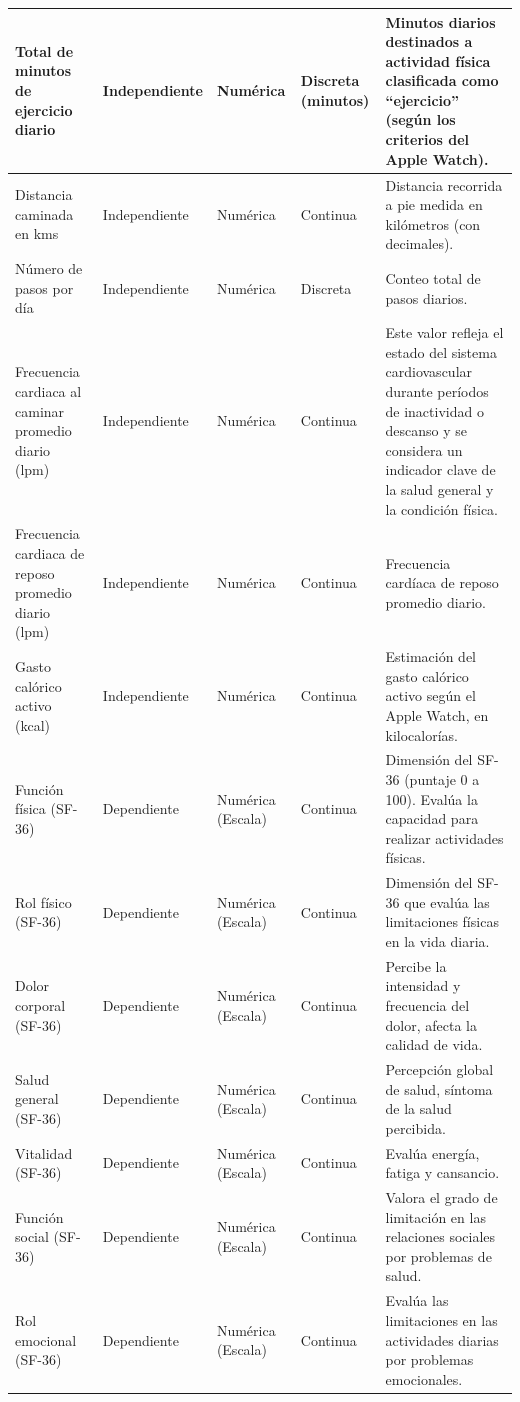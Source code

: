 \begin{table}[H]
\begin{longtable}{@{}p{3.5cm}p{2cm}p{2cm}p{2cm}p{4.5cm}@{}}
\midrule
Total de minutos de ejercicio diario & Independiente & Numérica & Discreta (minutos) & Minutos diarios destinados a actividad física clasificada como ``ejercicio'' (según los criterios del Apple Watch). \\
\midrule
Distancia caminada en kms & Independiente & Numérica & Continua & Distancia recorrida a pie medida en kilómetros (con decimales). \\
\midrule
Número de pasos por día & Independiente & Numérica & Discreta & Conteo total de pasos diarios. \\
\midrule
Frecuencia cardiaca al caminar promedio diario (lpm) & Independiente & Numérica & Continua & Este valor refleja el estado del sistema cardiovascular durante períodos de inactividad o descanso y se considera un indicador clave de la salud general y la condición física. \\
\midrule
Frecuencia cardiaca de reposo promedio diario (lpm) & Independiente & Numérica & Continua & Frecuencia cardíaca de reposo promedio diario. \\
\midrule
Gasto calórico activo (kcal) & Independiente & Numérica & Continua & Estimación del gasto calórico activo según el Apple Watch, en kilocalorías. \\
\midrule
Función física (SF-36) & Dependiente & Numérica (Escala) & Continua & Dimensión del SF-36 (puntaje 0 a 100). Evalúa la capacidad para realizar actividades físicas. \\
\midrule
Rol físico (SF-36) & Dependiente & Numérica (Escala) & Continua & Dimensión del SF-36 que evalúa las limitaciones físicas en la vida diaria. \\
\midrule
Dolor corporal (SF-36) & Dependiente & Numérica (Escala) & Continua & Percibe la intensidad y frecuencia del dolor, afecta la calidad de vida. \\
\midrule
Salud general (SF-36) & Dependiente & Numérica (Escala) & Continua & Percepción global de salud, síntoma de la salud percibida. \\
\midrule
Vitalidad (SF-36) & Dependiente & Numérica (Escala) & Continua & Evalúa energía, fatiga y cansancio. \\
\midrule
Función social (SF-36) & Dependiente & Numérica (Escala) & Continua & Valora el grado de limitación en las relaciones sociales por problemas de salud. \\
\midrule
Rol emocional (SF-36) & Dependiente & Numérica (Escala) & Continua & Evalúa las limitaciones en las actividades diarias por problemas emocionales. \\

\end{longtable}
\end{table}
